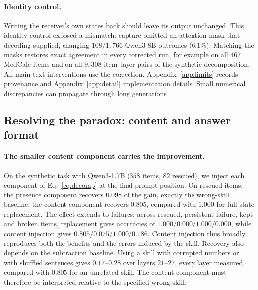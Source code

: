 \documentclass{article}
\begin{document}
\paragraph{Identity control.}
Writing the receiver's own states back should leave its output unchanged.
This identity control exposed a mismatch: capture omitted an attention mask
that decoding supplied, changing $108/1{,}766$ Qwen3-8B outcomes ($6.1\%$).
Matching the masks restores exact agreement in every corrected run, for
example on all $467$ MedCalc items and on all $9{,}308$ item--layer pairs of the
synthetic decomposition. All main-text interventions use the correction. Appendix~\ref{app:limits} records
provenance and Appendix~\ref{app:detail} implementation details. Small numerical
discrepancies can propagate through long generations \citep{he2025nondeterminism}.

\subsection{Resolving the paradox: content and answer format}
\label{sec:decomp}

\paragraph{The smaller content component carries the improvement.}
On the synthetic task with Qwen3-1.7B ($358$ items, $82$ rescued), we inject
each component of Eq.~\ref{eq:decomp} at the final prompt position. On rescued
items, the presence component recovers $0.098$ of the gain, exactly the
wrong-skill baseline; the content component recovers $0.805$, compared with
$1.000$ for full state replacement. The effect extends to failures: across
rescued, persistent-failure, kept and broken items, replacement gives
accuracies of $1.000/0.000/1.000/0.000$, while content injection gives
$0.805/0.075/1.000/0.186$. Content injection thus broadly reproduces both the
benefits and the errors induced by the skill. Recovery also depends on the
subtraction baseline. Using a skill with corrupted numbers or with shuffled sentences gives
$0.17$--$0.28$ over layers $21$--$27$, every layer measured, compared with
$0.805$ for an unrelated skill. The content component must therefore be
interpreted relative to the specified wrong skill.
\end{document}
